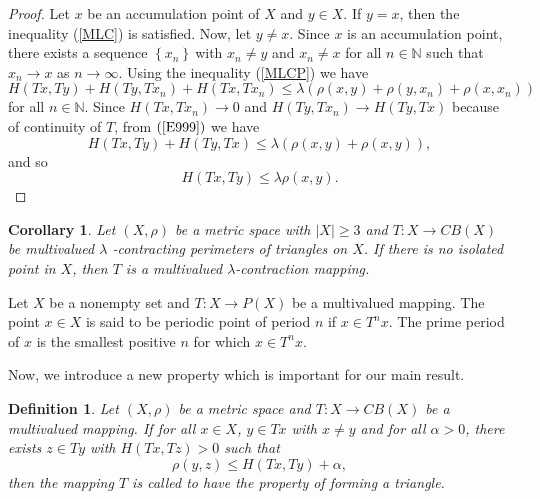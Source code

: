 \documentclass[reqno,11pt]{amsart}
\theoremstyle{plain}
\newtheorem{corollary}{Corollary}
\newtheorem{definition}{Definition}
\numberwithin{equation}{section}
\begin{document}
\begin{proof}
Let $x$ be an accumulation point of $X$ and $y\in X$. If $y=x$, then the
inequality (\ref{MLC}) is satisfied. Now, let $y\neq x$. Since $x$ is an
accumulation point, there exists a sequence $\left \{ x_{n}\right \} ~$with $%
x_{n}\neq y$ and $x_{n}\neq x$ for all $n\in 
\mathbb{N}
$ such that $x_{n}\rightarrow x$ as $n\rightarrow \infty $. Using the
inequality (\ref{MLCP}) we have%
\begin{equation}
H\left( Tx,Ty\right) +H\left( Ty,Tx_{n}\right) +H\left( Tx,Tx_{n}\right)
\leq \lambda \left( \rho (x,y)+\rho (y,x_{n})+\rho (x,x_{n})\right)
\label{E999}
\end{equation}%
for all $n\in 
\mathbb{N}
$. Since $H\left( Tx,Tx_{n}\right) \rightarrow 0$ and $H\left(
Ty,Tx_{n}\right) \rightarrow H\left( Ty,Tx\right) $ because of continuity of 
$T$, from $\left( \ref{E999}\right) ~$we have 
\begin{equation*}
H\left( Tx,Ty\right) +H\left( Ty,Tx\right) \leq \lambda \left( \rho
(x,y)+\rho (x,y)\right) ,
\end{equation*}%
and so%
\begin{equation*}
H\left( Tx,Ty\right) \leq \lambda \rho (x,y).
\end{equation*}
\end{proof}

\begin{corollary}
Let $\left( X,\rho \right) $ be a metric space with $\left \vert
X\right
\vert \geq 3$ and $T:X\rightarrow CB(X)$ be multivalued $\lambda $%
-contracting perimeters of triangles on $X$. If there is no isolated point
in $X$, then $T $ is a multivalued $\lambda $-contraction mapping.
\end{corollary}

Let $X$ be a nonempty set and $T:X\rightarrow P\left( X\right) $ be a
multivalued mapping. The point $x\in X$ is said to be periodic point of
period $n$ if $x\in T^{n}x$. The prime period of $x$ is the smallest
positive $n$ for which $x\in T^{n}x$.

Now, we introduce a new property which is important for our main result.

\begin{definition}
Let $\left( X,\rho \right) $ be a metric space and $T:X\rightarrow CB(X)$ be
a multivalued mapping. If for all $x\in X$, $y\in Tx$ with $x\neq y$ and for
all $\alpha >0$, there exists $z\in Ty$ with $H(Tx,Tz)>0$ such that%
\begin{equation*}
\rho (y,z)\leq H(Tx,Ty)+\alpha ,
\end{equation*}%
then the mapping $T$ is called to have the property of forming a triangle.
\end{definition}
\end{document}

